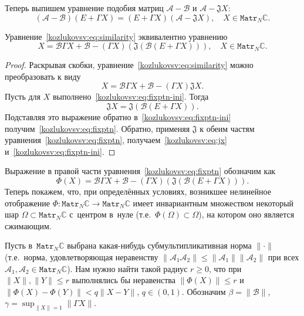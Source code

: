 Теперь выпишем уравнение подобия матриц \( \mathcal{A} - \mathcal{B} \)
и \( \mathcal{A} - \mathfrak{J} X \):
\begin{equation}\label{kozlukovsv:eq:similarity}
    (\mathcal{A-B})(E+\Gamma X) = (E+\Gamma X)(\mathcal{A} - \mathfrak{J} X), \quad X\in\mathtt{Matr}_N\mathbb{C}.
\end{equation}
\begin{lem}
    Уравнение~\eqref{kozlukovsv:eq:similarity} эквивалентно уравнению
    \begin{equation}\label{kozlukovsv:eq:fixptn}
        X = \mathcal{B} \Gamma X + \mathcal{B} - (\Gamma X)(\mathfrak{J}(\mathcal{B} (E + \Gamma X))), \quad X\in\mathtt{Matr}_N\mathbb{C}.
    \end{equation}
\end{lem}
\begin{proof}
Раскрывая скобки, уравнение~\eqref{kozlukovsv:eq:similarity} можно преобразовать к виду
\begin{equation}\label{kozlukovsv:eq:fixptn-ini}
    X = \mathcal{B} \Gamma X + \mathcal{B} - (\Gamma X) \mathfrak{J} X.
\end{equation}
Пусть для \( X \) выполнено~\eqref{kozlukovsv:eq:fixptn-ini}.
Тогда
    \begin{equation}\label{kozlukovsv:eq:jx}
        \mathfrak{J} X = \mathfrak{J}(\mathcal{B} (E + \Gamma X)).
    \end{equation}
Подставляя это выражение обратно в~\eqref{kozlukovsv:eq:fixptn-ini}
    получим~\eqref{kozlukovsv:eq:fixptn}.
Обратно, применяя \( \mathfrak{J} \) к обеим частям уравнения~\eqref{kozlukovsv:eq:fixptn},
    получаем~\eqref{kozlukovsv:eq:jx} и~\eqref{kozlukovsv:eq:fixptn-ini}.
\end{proof}

Выражение в правой части уравнения~\eqref{kozlukovsv:eq:fixptn} обозначим как
\[
    \Phi(X) = \mathcal{B} \Gamma X + \mathcal{B} - (\Gamma X)(\mathfrak{J}(\mathcal{B} (E + \Gamma X))).\]
Теперь покажем, что, при определ\"енных условиях,
возникшее нелинейное отображение \( \Phi:\mathtt{Matr}_N\mathbb{C}\to \mathtt{Matr}_N\mathbb{C} \) имеет инвариантным множеством
некоторый шар \( \Omega \subset \mathtt{Matr}_N\mathbb{C} \) с~центром в~нуле
(т.е.~\( \Phi(\Omega)\subset\Omega \)),
на котором оно является сжимающим.

Пусть в~\( \mathtt{Matr}_N\mathbb{C} \)
выбрана какая-нибудь субмультипликативная норма \( \|\cdot\| \)
(т.е.~норма, удовлетворяющая неравенству
 \( \| \mathcal{A}_1\mathcal{A}_2 \| \leq \|\mathcal{A}_1\|\|\mathcal{A}_2\| \)
 при всех \( \mathcal{A}_1, \mathcal{A}_2 \in \mathtt{Matr}_N\mathbb{C} \)).
Нам нужно найти такой радиус \( r \geq 0 \),
что при \( \|X\|,\|Y\| \leq r \) выполнялись бы неравенства \( \|\Phi(X)\| \leq r \)
и~\( \|\Phi(X) - \Phi(Y)\| < q\|X-Y\| \), \( q\in(0,1) \).
Обозначим
\( \beta = \|\mathcal{B}\| \), \( \gamma = \sup_{\|X\|=1} \|\Gamma X\| \).

